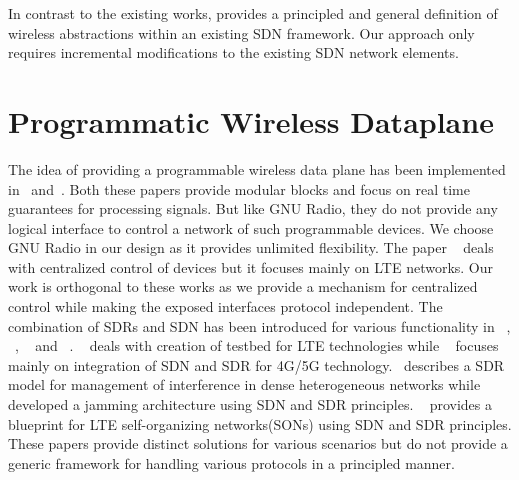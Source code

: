 In contrast to the existing works, \aetherflow  provides a principled and general definition of wireless abstractions within an existing SDN framework. Our approach only requires incremental modifications to the existing SDN network elements.

\section{Programmatic Wireless Dataplane} 

The idea of providing a programmable wireless data plane has been implemented in~\cite{atomix} and~\cite{openradio}. Both these papers provide modular blocks and focus on real time guarantees for processing signals. But like GNU Radio, they do not provide any logical interface to control a network of such programmable devices. We choose GNU Radio in our design as it provides unlimited flexibility. The paper ~\cite{softran} deals with centralized control of devices but it focuses mainly on LTE networks. Our work is orthogonal to these works as we provide a mechanism for centralized control while making the exposed interfaces protocol independent.
The combination of SDRs and SDN has been introduced for various functionality in ~\cite{cho2014integration, sun2015integrating}, ~\cite{mancuso2014prototyping}, ~\cite{corbett2014countering} and ~\cite{sdnsdrinsno}. ~\cite{mancuso2014prototyping} deals with creation of testbed for LTE technologies while ~\cite{cho2014integration, sun2015integrating} focuses mainly on integration of SDN and SDR for 4G/5G technology.~\cite{gupta2015labview} describes a SDR model for management of interference in dense heterogeneous networks while ~\cite{corbett2014countering} developed a jamming architecture using SDN and SDR principles. ~\cite{sdnsdrinsno} provides a blueprint for LTE self-organizing networks(SONs) using SDN and SDR principles. These papers provide distinct solutions for various scenarios but do not provide a generic framework for handling various protocols in a principled manner.

